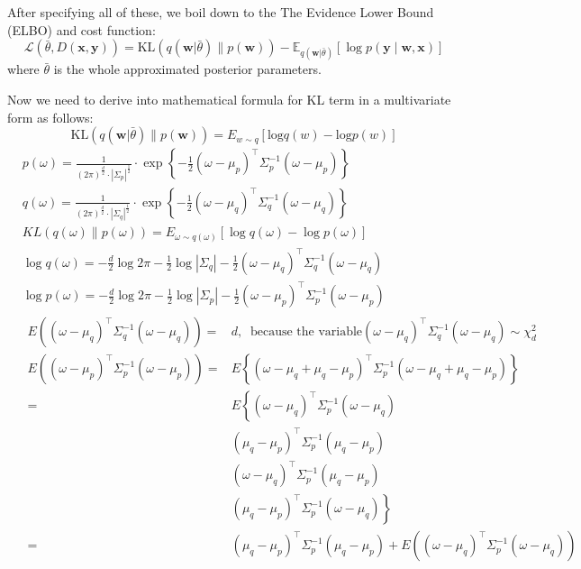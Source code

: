 \documentclass{article}
\begin{document}
After specifying all of these, we boil down to the The Evidence Lower Bound (ELBO) and cost function: $$\mathcal{L}(\bar{\theta},D(\mathbf{x},\mathbf{y}))=\mathrm{KL}(q(\mathbf{w}|\bar{\theta}) \| p(\mathbf{w})) - \mathbb{E}_{q(\mathbf{w}|\bar{\theta})}[\log p(\mathbf{y} \mid \mathbf{w}, \mathbf{x})]$$ where $\bar{\theta}$ is the whole approximated posterior parameters. 

Now we need to derive into mathematical formula for KL term in a multivariate form as follows: 
$$\mathrm{KL}(q(\mathbf{w}|\bar{\theta}) \| p(\mathbf{w}))=E_{w\sim q}[\text{log}q(w)-\text{log}p(w)]$$
$$\begin{aligned}
& p(\omega)=\frac{1}{(2 \pi)^{\frac{d}{2}} \cdot  \left|\Sigma_p\right|^{\frac{1}{2}}} \cdot \exp \left\{-\frac{1}{2}\left(\omega-\mu_p\right)^{\top} \Sigma_p^{-1}\left(\omega-\mu_p\right)\right\} \\
& q(\omega)=\frac{1}{(2 \pi)^{\frac{d}{2}} \cdot\left|\Sigma_q\right|^{\frac{1}{2}}} \cdot \exp \left\{-\frac{1}{2}\left(\omega-\mu_q\right)^{\top} \Sigma_q^{-1}\left(\omega-\mu_q\right)\right\} \\
& K L(q(\omega) \| p(\omega))=E_{\omega\sim q(\omega)}[\log q(\omega)-\log p(\omega)] \\
& \log q(\omega)=-\frac{d}{2} \log 2 \pi-\frac{1}{2} \log \left|\Sigma_q\right|-\frac{1}{2}\left(\omega-\mu_q\right)^{\top} \Sigma_q^{-1}\left(\omega-\mu_q\right) \\
& \log p(\omega)=-\frac{d}{2} \log 2 \pi-\frac{1}{2} \log |\Sigma_p|-\frac{1}{2}\left(\omega-\mu_p\right)^{\top} \Sigma_p^{-1}\left(\omega-\mu_p\right) \\
& \begin{aligned}
E\left(\left(\omega-\mu_q\right)^{\top} \Sigma_q^{-1}\left(\omega-\mu_q\right)\right)= & d,\;\; \text{because the variable} \left(\omega-\mu_q\right)^{\top} \Sigma_q^{-1}\left(\omega-\mu_q\right) \sim \chi^2_d \\
E\left(\left(\omega-\mu_p\right)^{\top} \Sigma_p^{-1}\left(\omega-\mu_p\right)\right)= & E\left\{\left(\omega-\mu_q+\mu_q-\mu_p\right)^{\top} \Sigma_p^{-1}\left(\omega-\mu_q+\mu_q-\mu_p\right)\right\} \\
= & E\left\{\left(\omega-\mu_q\right)^{\top} \Sigma_p^{-1}\left(\omega-\mu_q\right)\right. \\
& \left(\mu_q-\mu_p\right)^{\top} \Sigma_p^{-1}\left(\mu_q-\mu_p\right) \\
& \left(\omega-\mu_q\right)^{\top} \Sigma_p^{-1}\left(\mu_q-\mu_p\right) \\
& \left.\left(\mu_q-\mu_p\right)^{\top} \Sigma_p^{-1}\left(\omega-\mu_q\right)\right\} \\
= & \left(\mu_q-\mu_p\right)^{\top} \Sigma_p^{-1}\left(\mu_q-\mu_p\right) 
+  E\left(\left(\omega-\mu_q\right)^{\top} \Sigma_p^{-1}\left(\omega-\mu_q\right)\right)
\end{aligned}
\end{aligned}
$$
\end{document}
